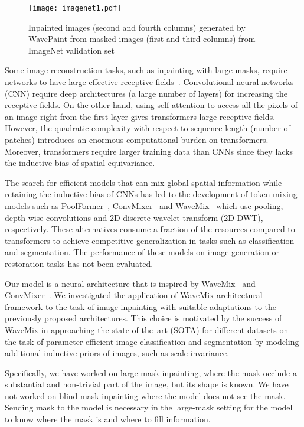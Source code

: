 \documentclass{article}
\begin{document}
\begin{figure}[]
\centering
\texttt{[image: imagenet1.pdf]}
\caption{Inpainted images (second and fourth columns) generated by WavePaint from masked images (first and third columns) from ImageNet validation set}
\label{fig:pics}
\end{figure}

Some image reconstruction tasks, such as inpainting with large masks, require networks to have large effective receptive fields~\cite{luo2017understanding}. Convolutional neural networks (CNN) require deep architectures (a large number of layers) for increasing the receptive fields. On the other hand, using self-attention to access all the pixels of an image right from the first layer gives transformers large receptive fields. However, the quadratic complexity with respect to sequence length (number of patches) introduces an enormous computational burden on transformers. Moreover, transformers require larger training data than CNNs since they lacks the inductive bias of spatial equivariance.

The search for efficient models that can mix global spatial information while retaining the inductive bias of CNNs has led to the development of token-mixing models such as PoolFormer~\cite{yu2022metaformer}, ConvMixer~\cite{trockman2022patches} and WaveMix~\cite{jeevan2023wavemix} which use pooling, depth-wise convolutions and 2D-discrete wavelet transform (2D-DWT), respectively.  These alternatives consume a fraction of the resources compared to transformers to achieve competitive generalization in tasks such as classification and segmentation. The performance of these models on image generation or restoration tasks has not been evaluated. 

Our model is a neural architecture that is inspired by WaveMix~\cite{jeevan2023wavemix} and ConvMixer~\cite{trockman2022patches}. 
We investigated the application of WaveMix architectural framework to the task of image inpainting with suitable adaptations to the previously proposed architectures.
This choice is motivated by the success of WaveMix in approaching the state-of-the--art (SOTA) for different datasets on the task of parameter-efficient image classification and segmentation by modeling additional inductive priors of images, such as scale invariance.

Specifically, we have worked on large mask inpainting, where the mask occlude a substantial and non-trivial part of the image, but its shape is known. We have not worked on blind mask inpainting where the model does not see the mask. Sending mask to the model is necessary in the large-mask setting for the model to know where the mask is and where to fill information. 
\end{document}
